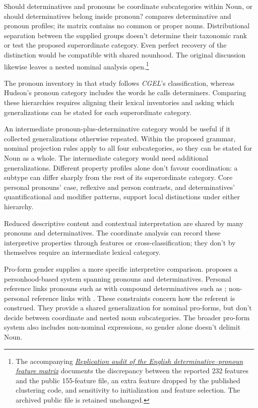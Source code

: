 \documentclass[12pt]{article}
\begin{document}
Should determinatives and pronouns be coordinate subcategories within Noun, or should determinatives belong inside pronoun? \textcite{reynolds2021} compares determinative and pronoun profiles; its matrix contains no common or proper nouns. Distributional separation between the supplied groups doesn't determine their taxonomic rank or test the proposed superordinate category. Even perfect recovery of the distinction would be compatible with shared nounhood. The original discussion likewise leaves a nested nominal analysis open.\footnote{The accompanying \href{run:matrix-audit.pdf}{\textit{Replication audit of the English determinative--pronoun feature matrix}} documents the discrepancy between the reported 232 features and the public 155-feature file, an extra feature dropped by the published clustering code, and sensitivity to initialization and feature selection. The archived public file is retained unchanged.}

The pronoun inventory in that study follows \textit{CGEL}'s classification, whereas Hudson's pronoun category includes the words he calls determiners. Comparing these hierarchies requires aligning their lexical inventories and asking which generalizations can be stated for each superordinate category.

An intermediate pronoun-plus-determinative category would be useful if it collected generalizations otherwise repeated. Within the proposed grammar, nominal projection rules apply to all four subcategories, so they can be stated for Noun as a whole. The intermediate category would need additional generalizations. Different property profiles alone don't favour coordination: a subtype can differ sharply from the rest of its superordinate category. Core personal pronouns' case, reflexive and person contrasts, and determinatives' quantificational and modifier patterns, support local distinctions under either hierarchy.

Reduced descriptive content and contextual interpretation are shared by many pronouns and determinatives. The coordinate analysis can record these interpretive properties through features or cross-classification; they don't by themselves require an intermediate lexical category.

Pro-form gender supplies a more specific interpretive comparison. \textcite{reynolds2025proformgender} proposes a personhood-based system spanning pronouns and determinatives. Personal reference links pronouns such as  with compound determinatives such as ; non-personal reference links  with . These constraints concern how the referent is construed. They provide a shared generalization for nominal pro-forms, but don't decide between coordinate and nested noun subcategories. The broader pro-form system also includes non-nominal expressions, so gender alone doesn't delimit Noun.
\end{document}
